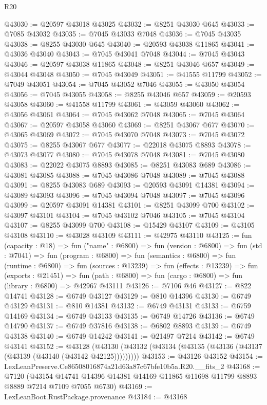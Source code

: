 \begin{lexlean}{R20}
\begin{coremodule}
{@43030 := @20597 @43018 @43025
@43032 := @8251 @43030 @645
@43033 := @7085 @43032
@43035 := @7045 @43033 @7048
@43036 := @7045 @43035
@43038 := @8255 @43030 @645
@43040 := @20593 @43038 @11865
@43041 := @43036 @43040
@43043 := @7045 @43041 @7048
@43044 := @7045 @43043
@43046 := @20597 @43038 @11865
@43048 := @8251 @43046 @657
@43049 := @43044 @43048
@43050 := @7045 @43049
@43051 := @41555 @11799
@43052 := @7049 @43051
@43054 := @7045 @43052 @7046
@43055 := @43050 @43054
@43056 := @7045 @43055
@43058 := @8255 @43046 @657
@43059 := @20593 @43058
@43060 := @41558 @11799
@43061 := @43059 @43060
@43062 := @43056 @43061
@43064 := @7045 @43062 @7048
@43065 := @7045 @43064
@43067 := @20597 @43058 @43060
@43069 := @8251 @43067 @677
@43070 := @43065 @43069
@43072 := @7045 @43070 @7048
@43073 := @7045 @43072
@43075 := @8255 @43067 @677
@43077 := @22018 @43075 @8893
@43078 := @43073 @43077
@43080 := @7045 @43078 @7048
@43081 := @7045 @43080
@43083 := @22022 @43075 @8893
@43085 := @8251 @43083 @689
@43086 := @43081 @43085
@43088 := @7045 @43086 @7048
@43089 := @7045 @43088
@43091 := @8255 @43083 @689
@43093 := @20593 @43091 @14381
@43094 := @43089 @43093
@43096 := @7045 @43094 @7048
@43097 := @7045 @43096
@43099 := @20597 @43091 @14381
@43101 := @8251 @43099 @700
@43102 := @43097 @43101
@43104 := @7045 @43102 @7046
@43105 := @7045 @43104
@43107 := @8255 @43099 @700
@43108 := @15429 @43107
@43109 := @43105 @43108
@43110 := @43028 @43109
@43111 := @42975 @43110
@43125 := fun (capacity : @18) =>
  fun ("name" : @6800) =>
  fun (version : @6800) =>
  fun (std : @7041) =>
  fun (program : @6800) =>
  fun (semantics : @6800) =>
  fun (runtime : @6800) =>
  fun (sources : @13239) =>
  fun (effects : @13239) =>
  fun (exports : @21451) =>
  fun (path : @6800) => fun (cargo : @6800) => fun (library : @6800) => @42967 @43111
@43126 := @7106 @46
@43127 := @822 @14741
@43128 := @6749 @43127
@43129 := @810 @14396
@43130 := @6749 @43129
@43131 := @810 @14381
@43132 := @6749 @43131
@43133 := @6759 @14169
@43134 := @6749 @43133
@43135 := @6749 @14726
@43136 := @6749 @14790
@43137 := @6749 @37816
@43138 := @6802 @8893
@43139 := @6749 @43138
@43140 := @6749 @14242
@43141 := @21497 @7214
@43142 := @6749 @43141
@43152 := @43128
    (@43130 (@43132 (@43134 (@43135 (@43136 (@43137 (@43139 (@43140 (@43142 @42125)))))))))
@43153 := @43126 @43152
@43154 := LexLeanPreserve.Ce86508016874a21d63a87c67bfe10b5a.R20.__fits_2
@43168 := @7120
    (@43154 @14741 @14396 @14381 @14169 @11865 @11698 @11799 @8893 @8889 @7214 @7109 @7055 @6730)
@43169 := LexLeanBoot.RustPackage.provenance
@43184 := @43168
}
\end{coremodule}
\end{lexlean}
